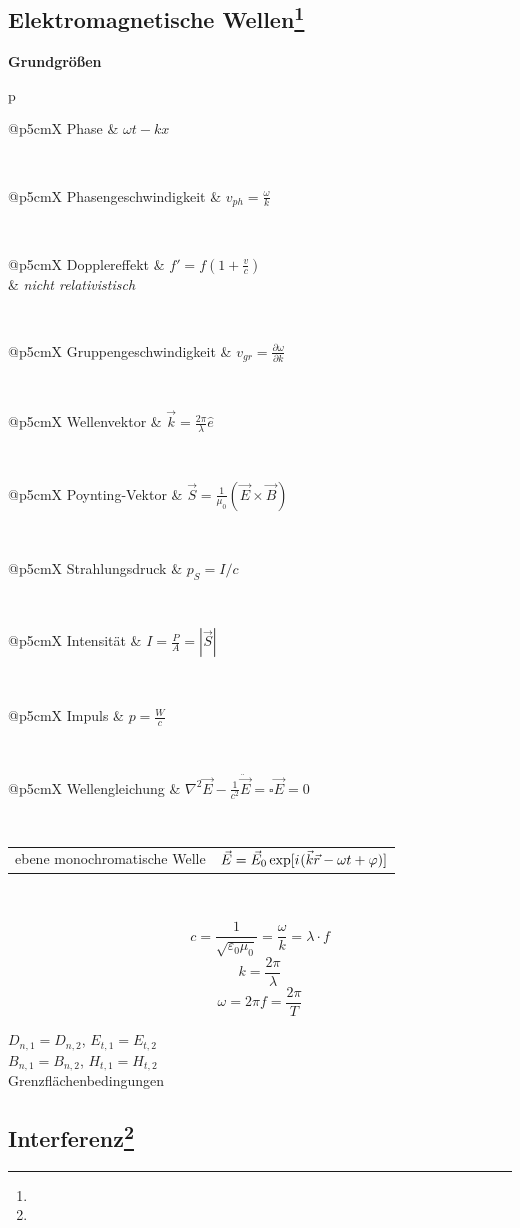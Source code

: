 \documentclass[12pt,a4paper, twoside]{article}
\makeatletter
\newcommand{\iu}{{i\mkern1mu}}
\newcommand{\pd}[2]{\frac{\partial #1}{\partial #2}}
\renewcommand{\=}[1]{\stackrel{#1}{=}}
\newcommand{\ort}{\vec r}
\theoremstyle{definition}
\theoremstyle{remark}
\newcommand{\concept}[2]{%
\noindent
\begin{framed}
\noindent\textbf{#1}
\par\begin{tabular}{p{\linewidth}}
#2
\end{tabular}
\end{framed}
}
\newcommand{\fnote}[3]{%
\noindent\begin{tabularx}{\linewidth}{@{}p{5cm}X}
#1 & $#2$\\
& \textit{\small{#3}}
\end{tabularx}}
\newcommand{\f}[2]{%
\noindent\begin{tabularx}{\linewidth}{@{}p{5cm}X}
#1 & $#2$
\end{tabularx}}
\makeatother
\begin{document}
\subsection[Elektromagnetische Wellen]{Elektromagnetische Wellen\let\thefootnote\relax\footnote{}}

\concept{Grundgrößen}{
\f{Phase}{\omega t - k x}\\
\f{Phasengeschwindigkeit}{v_{ph} = \frac{\omega}{k}}\\
\fnote{Dopplereffekt}{f' = f(1+\frac{v}{c})}{nicht relativistisch}\\
\f{Gruppengeschwindigkeit}{v_{gr} = \pd{\omega}{k}}\\
\f{Wellenvektor}{\vec k = \frac{2 \pi}{\lambda} \hat e}\\
\f{Poynting-Vektor}{\vec{S} = \frac{1}{\mu_0}(\vec{E} \times \vec{B})}\\
\f{Strahlungsdruck}{p_S = I/c}\\
\f{Intensität}{I = \frac{P}{A} = |\vec{S}|}\\
\f{Impuls}{p = \frac{W}{c}}\\
\f{Wellengleichung}{\nabla^2 \vec E - \frac{1}{c^2} \ddot{\vec{E}} = \square \vec E = 0}\\
\f{ebene monochromatische Welle}{\vec E = \vec E_0 \exp [\iu(\vec k \ort - \omega t + \varphi)]}\\

}

\begin{center}
\begin{framed}
$$c = \frac{1}{\sqrt{\varepsilon_0 \mu_0}} = \frac{\omega}{k} = \lambda \cdot f$$
$$k = \frac{2\pi}{\lambda}$$
$$\omega = 2\pi f = \frac{2\pi}{T}$$
\end{framed}
\end{center}

\begin{center}
\begin{framed}
$D_{n,1} = D_{n,2}$, $E_{t,1} = E_{t,2}$\\
$B_{n,1} = B_{n,2}$, $H_{t,1} = H_{t,2}$\\
Grenzflächenbedingungen
\end{framed}
\end{center}

\subsection[Interferenz]{Interferenz\let\thefootnote\relax\footnote{}}
\end{document}
